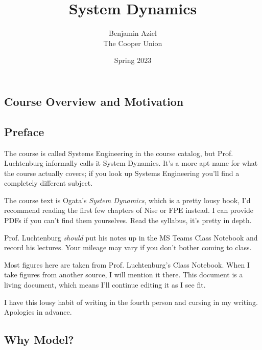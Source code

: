 \documentclass{report}
\begin{document}
\thispagestyle{empty}
\title{\textbf{System Dynamics}}
\date{Spring 2023}
\author{Benjamin Aziel\\ The Cooper Union}
\maketitle



\thispagestyle{empty}
\begin{onehalfspacing}
\tableofcontents

\begin{flushleft}
\chapter{Course Overview and Motivation}

\section*{Preface}

The course is called Systems Engineering in the course catalog, but Prof. Luchtenburg informally calls it System Dynamics. It's a more apt name for what the course actually covers; if you look up Systems Engineering you'll find a completely different subject.

\medskip

The course text is Ogata's \textit{System Dynamics}, which is a pretty lousy book, I'd recommend reading the first few chapters of Nise or FPE instead. I can provide PDFs if you can't find them yourselves. Read the syllabus, it's pretty in depth.

\medskip

Prof. Luchtenburg \textit{should} put his notes up in the MS Teams Class Notebook and record his lectures. Your mileage may vary if you don't bother coming to class.

\medskip

Most figures here are taken from Prof. Luchtenburg's Class Notebook. When I take figures from another source, I will mention it there. This document is a living document, which means I'll continue editing it as I see fit.

\medskip

I have this lousy habit of writing in the fourth person and cursing in my writing. Apologies in advance.

\section{Why Model?}


\end{flushleft}
\end{onehalfspacing}
\end{document}
